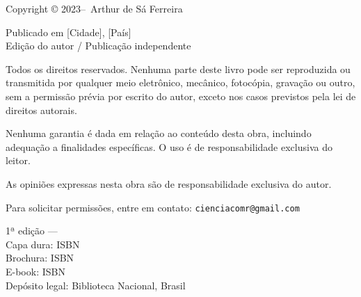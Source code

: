 \newcommand{\copyrightnotice}{
  \begin{center}
    \small
    Copyright © 2023--\the\year\ Arthur de Sá Ferreira

    \vspace{1em}

    Publicado em [Cidade], [País] \\
    Edição do autor / Publicação independente

    \vspace{1em}

    Todos os direitos reservados. Nenhuma parte deste livro pode ser reproduzida
    ou transmitida por qualquer meio eletrônico, mecânico, fotocópia, gravação
    ou outro, sem a permissão prévia por escrito do autor, exceto nos casos
    previstos pela lei de direitos autorais.

    \vspace{1em}

    Nenhuma garantia é dada em relação ao conteúdo desta obra, incluindo
    adequação a finalidades específicas. O uso é de responsabilidade
    exclusiva do leitor.

    \vspace{1em}

    As opiniões expressas nesta obra são de responsabilidade exclusiva do autor.

    \vspace{1em}

    Para solicitar permissões, entre em contato: \texttt{cienciacomr@gmail.com}

    \vspace{2em}

    1ª edição — \the\year \\
    Capa dura: ISBN \\
    Brochura: ISBN \\
    E-book: ISBN \\

    \vspace{1em}
    Depósito legal: Biblioteca Nacional, Brasil
  \end{center}
}

\copyrightnotice

\newpage

